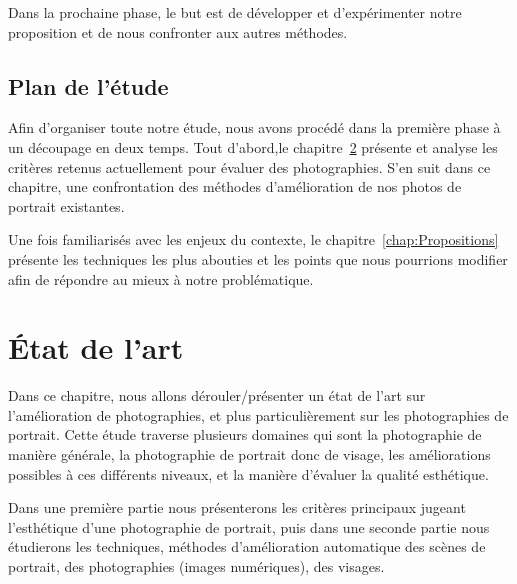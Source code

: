 \documentclass[11pt, french]{report-rd-info}
\begin{document}
Dans la prochaine phase, le but est de développer et d'expérimenter notre proposition et de nous confronter aux autres méthodes.


\section{Plan de l'étude}
Afin d'organiser toute notre étude, nous avons procédé dans la première phase à un découpage en deux temps. Tout d'abord,le chapitre~\ref{chap:EtatArt} présente et analyse les critères retenus actuellement pour évaluer des photographies. S'en suit dans ce chapitre, une confrontation des méthodes d'amélioration de nos photos de portrait existantes. 

Une fois familiarisés avec les enjeux du contexte, le chapitre~\ref{chap:Propositions} présente les techniques les plus abouties et les points que nous pourrions modifier afin de répondre au mieux à notre problématique. 



\chapter{\'Etat de l'art}
\label{chap:EtatArt}
Dans ce chapitre, nous allons dérouler/présenter un état de l’art sur l’amélioration de photographies, et plus particulièrement sur les photographies de portrait. Cette étude traverse plusieurs domaines qui sont la photographie de manière générale, la photographie de portrait donc de visage, les améliorations possibles à ces différents niveaux, et la manière d’évaluer la qualité esthétique.

Dans une première partie nous présenterons les critères principaux jugeant l’esthétique d’une photographie de portrait, puis dans une seconde partie nous étudierons les techniques, méthodes d’amélioration automatique des scènes de portrait, des photographies (images numériques), des visages.
\end{document}
